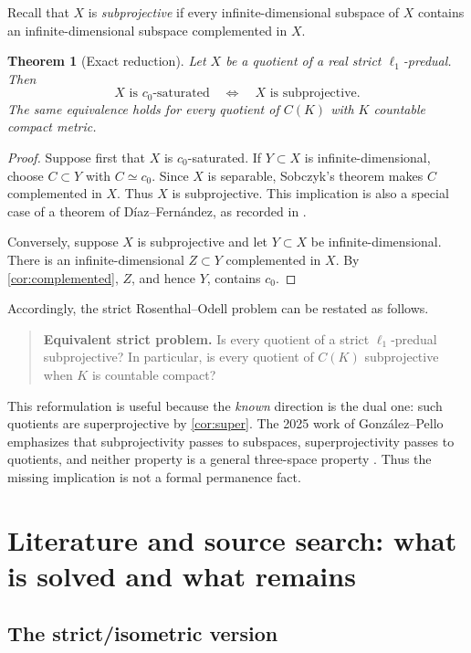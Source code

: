 \documentclass[11pt]{article}
\newtheorem{theorem}{Theorem}[section]
\theoremstyle{definition}
\newcommand{\isom}{\simeq}
\begin{document}
Recall that $X$ is \emph{subprojective} if every infinite-dimensional
subspace of $X$ contains an infinite-dimensional subspace complemented in
$X$.

\begin{theorem}[Exact reduction]\label{thm:equiv}
Let $X$ be a quotient of a real strict $\ell_1$-predual.  Then
\[
   X \text{ is }c_0\text{-saturated}
   \quad\Longleftrightarrow\quad
   X \text{ is subprojective}.
\]
The same equivalence holds for every quotient of $C(K)$ with $K$ countable
compact metric.
\end{theorem}

\begin{proof}
Suppose first that $X$ is $c_0$-saturated.  If $Y\subset X$ is
infinite-dimensional, choose $C\subset Y$ with $C\isom c_0$.  Since $X$ is
separable, Sobczyk's theorem makes $C$ complemented in $X$.  Thus $X$ is
subprojective.  This implication is also a special case of a theorem of
D\'iaz--Fern\'andez, as recorded in
\cite[Proposition~2.7]{GalegoGonzalezPello2017}.

Conversely, suppose $X$ is subprojective and let $Y\subset X$ be
infinite-dimensional.  There is an infinite-dimensional $Z\subset Y$
complemented in $X$.  By \cref{cor:complemented}, $Z$, and hence $Y$,
contains $c_0$.
\end{proof}

Accordingly, the strict Rosenthal--Odell problem can be restated as follows.

\begin{quote}
\textbf{Equivalent strict problem.} Is every quotient of a strict
$\ell_1$-predual subprojective?  In particular, is every quotient of
$C(K)$ subprojective when $K$ is countable compact?
\end{quote}

This reformulation is useful because the \emph{known} direction is the dual
one: such quotients are superprojective by \cref{cor:super}.  The 2025 work of
Gonz\'alez--Pello emphasizes that subprojectivity passes to subspaces,
superprojectivity passes to quotients, and neither property is a general
three-space property \cite{GonzalezPello2025}.  Thus the missing implication
is not a formal permanence fact.

\section{Literature and source search: what is solved and what remains}

\subsection{The strict/isometric version}
\end{document}
